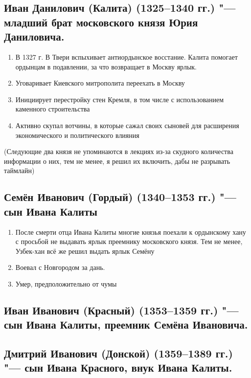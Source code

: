 \subsection{Иван Данилович (Калита) (1325--1340 гг.) "--- младший брат московского князя Юрия Даниловича.}

\begin{enumerate}
    \item{ В 1327 г. В Твери вспыхивает антиордынское восстание. Калита помогает ордынцам в подавлении, за что возвращает в Москву ярлык.}
    \item{ Уговаривает Киевского митрополита переехать в Москву}
    \item{ Инициирует перестройку стен Кремля, в том числе с использованием каменного строительства}
    \item{ Активно скупал вотчины, в которые сажал своих сыновей для расширения экономического и политического влияния}
\end{enumerate}

(Следующие два князя не упоминаются в лекциях из-за скудного количества информации о них, тем не менее, я решил их включить, дабы не разрывать таймлайн)

\subsection{Семён Иванович (Гордый) (1340--1353 гг.) "--- сын Ивана Калиты}

\begin{enumerate}
    \item{ После смерти отца Ивана Калиты многие князья поехали к ордынскому хану с просьбой не выдавать ярлык преемнику московского князя. Тем не менее, Узбек-хан всё же решил выдать ярлык Семёну}
    \item{ Воевал с Новгородом за дань.}
    \item{ Умер, предположительно от чумы}
\end{enumerate}

\subsection{Иван Иванович (Красный) (1353--1359 гг.) "--- сын Ивана Калиты, преемник Семёна Ивановича.}

\subsection{Дмитрий Иванович (Донской) (1359--1389 гг.) "--- сын Ивана Красного, внук Ивана Калиты.}

